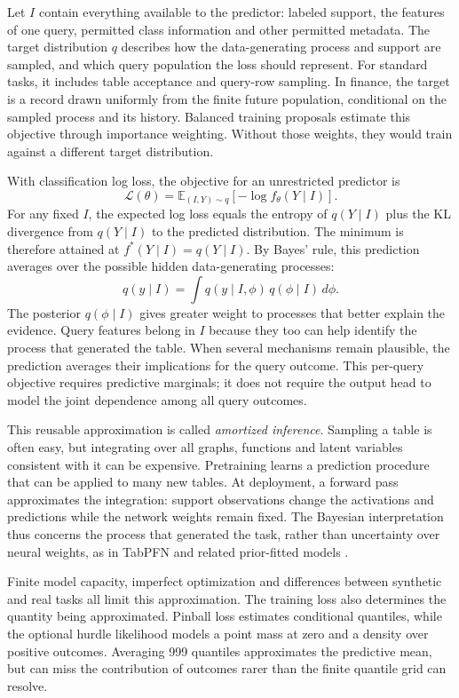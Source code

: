 \documentclass[11pt]{article}
\newcommand{\E}{\mathbb{E}}
\begin{document}
Let $I$ contain everything available to the predictor: labeled support, the features of one query, permitted class information and other permitted metadata. The target distribution $q$ describes how the data-generating process and support are sampled, and which query population the loss should represent. For standard tasks, it includes table acceptance and query-row sampling. In finance, the target is a record drawn uniformly from the finite future population, conditional on the sampled process and its history. Balanced training proposals estimate this objective through importance weighting. Without those weights, they would train against a different target distribution.

With classification log loss, the objective for an unrestricted predictor is
\[
 \mathcal L(\theta)=\E_{(I,Y)\sim q}[-\log f_\theta(Y\mid I)].
\]
For any fixed $I$, the expected log loss equals the entropy of $q(Y\mid I)$ plus the KL divergence from $q(Y\mid I)$ to the predicted distribution. The minimum is therefore attained at $f^*(Y\mid I)=q(Y\mid I)$. By Bayes' rule, this prediction averages over the possible hidden data-generating processes:
\[
 q(y\mid I)=\int q(y\mid I,\phi)\,q(\phi\mid I)\,d\phi.
\]
The posterior $q(\phi\mid I)$ gives greater weight to processes that better explain the evidence. Query features belong in $I$ because they too can help identify the process that generated the table. When several mechanisms remain plausible, the prediction averages their implications for the query outcome. This per-query objective requires predictive marginals; it does not require the output head to model the joint dependence among all query outcomes.

This reusable approximation is called \emph{amortized inference}. Sampling a table is often easy, but integrating over all graphs, functions and latent variables consistent with it can be expensive. Pretraining learns a prediction procedure that can be applied to many new tables. At deployment, a forward pass approximates the integration: support observations change the activations and predictions while the network weights remain fixed. The Bayesian interpretation thus concerns the process that generated the task, rather than uncertainty over neural weights, as in TabPFN and related prior-fitted models \cite{tabpfn,tabicl2}.

Finite model capacity, imperfect optimization and differences between synthetic and real tasks all limit this approximation. The training loss also determines the quantity being approximated. Pinball loss estimates conditional quantiles, while the optional hurdle likelihood models a point mass at zero and a density over positive outcomes. Averaging 999 quantiles approximates the predictive mean, but can miss the contribution of outcomes rarer than the finite quantile grid can resolve.
\end{document}
